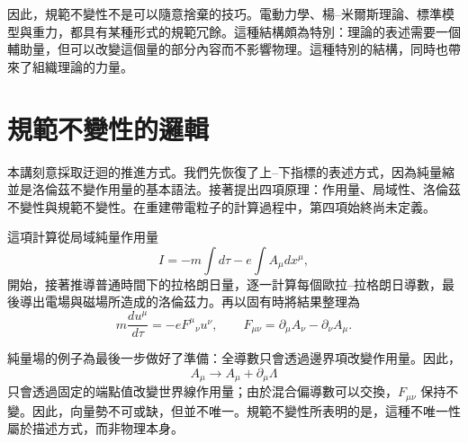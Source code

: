 \begin{classroomqa}
\end{classroomqa}

因此，規範不變性不是可以隨意捨棄的技巧。電動力學、楊--米爾斯理論、標準模型與重力，都具有某種形式的規範冗餘。這種結構頗為特別：理論的表述需要一個輔助量，但可以改變這個量的部分內容而不影響物理。這種特別的結構，同時也帶來了組織理論的力量。

\section{規範不變性的邏輯}

本講刻意採取迂迴的推進方式。我們先恢復了上--下指標的表述方式，因為純量縮並是洛倫茲不變作用量的基本語法。接著提出四項原理：作用量、局域性、洛倫茲不變性與規範不變性。在重建帶電粒子的計算過程中，第四項始終尚未定義。

這項計算從局域純量作用量
\begin{equation}
I
=
-m\int d\tau
-e\int A_\mu dx^\mu,
\end{equation}
開始，接著推導普通時間下的拉格朗日量，逐一計算每個歐拉--拉格朗日導數，最後導出電場與磁場所造成的洛倫茲力。再以固有時將結果整理為
\begin{equation}
m\frac{du^\mu}{d\tau}
=
-eF^\mu{}_\nu u^\nu,
\qquad
F_{\mu\nu}
=
\partial_\mu A_\nu-\partial_\nu A_\mu.
\end{equation}

純量場的例子為最後一步做好了準備：全導數只會透過邊界項改變作用量。因此，
\begin{equation}
A_\mu\longrightarrow A_\mu+\partial_\mu\Lambda
\end{equation}
只會透過固定的端點值改變世界線作用量；由於混合偏導數可以交換，\(F_{\mu\nu}\) 保持不變。因此，向量勢不可或缺，但並不唯一。規範不變性所表明的是，這種不唯一性屬於描述方式，而非物理本身。